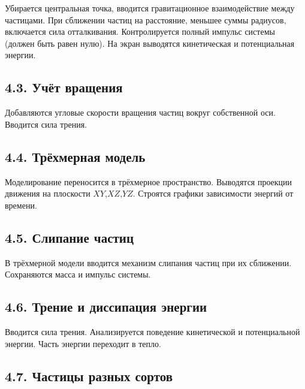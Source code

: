 \documentclass[
  english,
  russian,
  12pt,
  a4paper,
  DIV=11,
  numbers=noendperiod]{scrreprt}
\begin{document}
Убирается центральная точка, вводится гравитационное взаимодействие
между частицами. При сближении частиц на расстояние, меньшее суммы
радиусов, включается сила отталкивания. Контролируется полный импульс
системы (должен быть равен нулю). На экран выводятся кинетическая и
потенциальная энергии.

\subsection{4.3. Учёт
вращения}\label{ux443ux447ux451ux442-ux432ux440ux430ux449ux435ux43dux438ux44f}

Добавляются угловые скорости вращения частиц вокруг собственной оси.
Вводится сила трения.

\subsection{4.4. Трёхмерная
модель}\label{ux442ux440ux451ux445ux43cux435ux440ux43dux430ux44f-ux43cux43eux434ux435ux43bux44c}

Моделирование переносится в трёхмерное пространство. Выводятся проекции
движения на плоскости \(XY\),\(XZ\),\(YZ\). Строятся графики зависимости
энергий от времени.

\subsection{4.5. Слипание
частиц}\label{ux441ux43bux438ux43fux430ux43dux438ux435-ux447ux430ux441ux442ux438ux446-1}

В трёхмерной модели вводится механизм слипания частиц при их сближении.
Сохраняются масса и импульс системы.

\subsection{4.6. Трение и диссипация
энергии}\label{ux442ux440ux435ux43dux438ux435-ux438-ux434ux438ux441ux441ux438ux43fux430ux446ux438ux44f-ux44dux43dux435ux440ux433ux438ux438}

Вводится сила трения. Анализируется поведение кинетической и
потенциальной энергии. Часть энергии переходит в тепло.

\subsection{4.7. Частицы разных
сортов}\label{ux447ux430ux441ux442ux438ux446ux44b-ux440ux430ux437ux43dux44bux445-ux441ux43eux440ux442ux43eux432}
\end{document}
